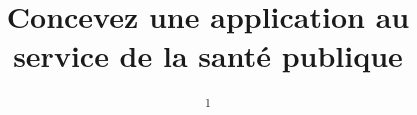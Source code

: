 \title{Concevez une application au service de la santé publique} %


\author{
	\newline\newline %
	\textsuperscript{1}\\ %
}


